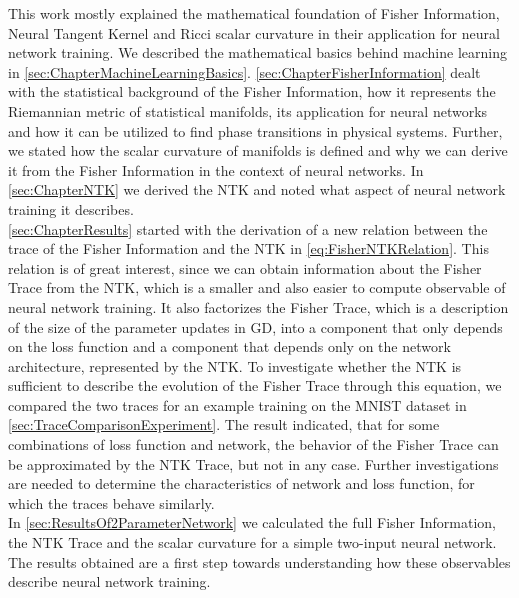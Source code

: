This work mostly explained the mathematical foundation of Fisher Information, Neural Tangent Kernel and Ricci scalar curvature in their application for neural network training. We described the mathematical basics behind machine learning in \cref{sec:ChapterMachineLearningBasics}. \cref{sec:ChapterFisherInformation} dealt with the statistical background of the Fisher Information, how it represents the Riemannian metric of statistical manifolds, its application for neural networks and how it can be utilized to find phase transitions in physical systems. Further, we stated how the scalar curvature of manifolds is defined and why we can derive it from the Fisher Information in the context of neural networks. In \cref{sec:ChapterNTK} we derived the NTK and noted what aspect of neural network training it describes.\\
\cref{sec:ChapterResults} started with the derivation of a new relation between the trace of the Fisher Information and the NTK in \cref{eq:FisherNTKRelation}. This relation is of great interest, since we can obtain information about the Fisher Trace from the NTK, which is a smaller and also easier to compute observable of neural network training. It also factorizes the Fisher Trace, which is a description of the size of the parameter updates in GD, into a component that only depends on the loss function and a component that depends only on the network architecture, represented by the NTK. To investigate whether the NTK is sufficient to describe the evolution of the Fisher Trace through this equation, we compared the two traces for an example training on the MNIST dataset in \cref{sec:TraceComparisonExperiment}. The result indicated, that for some combinations of loss function and network, the behavior of the Fisher Trace can be approximated by the NTK Trace, but not in any case. Further investigations are needed to determine the characteristics of network and loss function, for which the traces behave similarly.\\
In \cref{sec:ResultsOf2ParameterNetwork} we calculated the full Fisher Information, the NTK Trace and the scalar curvature for a simple two-input neural network. The results obtained are a first step towards understanding how these observables describe neural network training.\\
